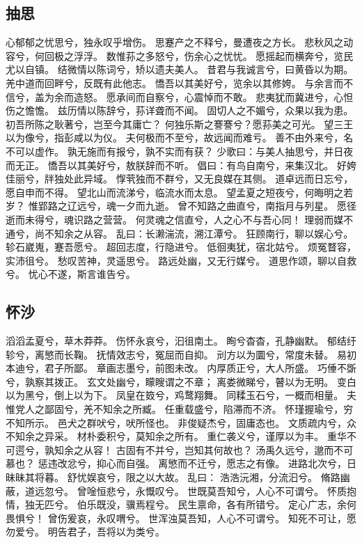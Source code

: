 \subsection{抽思}
心郁郁之忧思兮，独永叹乎增伤。
思蹇产之不释兮，曼遭夜之方长。
悲秋风之动容兮，何回极之浮浮。
数惟荪之多怒兮，伤余心之忧忧。
愿摇起而横奔兮，览民尤以自镇。
结微情以陈词兮，矫以遗夫美人。
昔君与我诚言兮，曰黄昏以为期。
羌中道而回畔兮，反既有此他志。
憍吾以其美好兮，览余以其修姱。
与余言而不信兮，盖为余而造怒。
愿承间而自察兮，心震悼而不敢。
悲夷犹而冀进兮，心怛伤之憺憺。
兹历情以陈辞兮，荪详聋而不闻。
固切人之不媚兮，众果以我为患。
初吾所陈之耿著兮，岂至今其庸亡？
何独乐斯之謇謇兮？愿荪美之可光。
望三王以为像兮，指彭咸以为仪。
夫何极而不至兮，故远闻而难亏。
善不由外来兮，名不可以虚作。
孰无施而有报兮，孰不实而有获？
少歌曰：与美人抽思兮，并日夜而无正。
憍吾以其美好兮，敖朕辞而不听。
倡曰：有鸟自南兮，来集汉北。
好姱佳丽兮，牉独处此异域。
惸茕独而不群兮，又无良媒在其侧。
道卓远而日忘兮，愿自申而不得。
望北山而流涕兮，临流水而太息。
望孟夏之短夜兮，何晦明之若岁？
惟郢路之辽远兮，魂一夕而九逝。
曾不知路之曲直兮，南指月与列星。
愿径逝而未得兮，魂识路之营营。
何灵魂之信直兮，人之心不与吾心同！
理弱而媒不通兮，尚不知余之从容。
乱曰：长濑湍流，溯江潭兮。
狂顾南行，聊以娱心兮。
轸石崴嵬，蹇吾愿兮。
超回志度，行隐进兮。
低徊夷犹，宿北姑兮。
烦冤瞀容，实沛徂兮。
愁叹苦神，灵遥思兮。
路远处幽，又无行媒兮。
道思作颂，聊以自救兮。
忧心不遂，斯言谁告兮。

\subsection{怀沙}
滔滔孟夏兮，草木莽莽。
伤怀永哀兮，汩徂南土。
眴兮杳杳，孔静幽默。
郁结纡轸兮，离慜而长鞠。
抚情效志兮，冤屈而自抑。
刓方以为圜兮，常度未替。
易初本迪兮，君子所鄙。
章画志墨兮，前图未改。
内厚质正兮，大人所盛。
巧倕不斲兮，孰察其拨正。
玄文处幽兮，矇瞍谓之不章；
离娄微睇兮，瞽以为无明。
变白以为黑兮，倒上以为下。
凤皇在笯兮，鸡鹜翔舞。
同糅玉石兮，一概而相量。
夫惟党人之鄙固兮，羌不知余之所臧。
任重载盛兮，陷滞而不济。
怀瑾握瑜兮，穷不知所示。
邑犬之群吠兮，吠所怪也。
非俊疑杰兮，固庸态也。
文质疏内兮，众不知余之异采。
材朴委积兮，莫知余之所有。
重仁袭义兮，谨厚以为丰。
重华不可遌兮，孰知余之从容！
古固有不并兮，岂知其何故也？
汤禹久远兮，邈而不可慕也？
惩违改忿兮，抑心而自强。
离慜而不迁兮，愿志之有像。
进路北次兮，日昧昧其将暮。
舒忧娱哀兮，限之以大故。
乱曰：
浩浩沅湘，分流汩兮。
脩路幽蔽，道远忽兮。
曾唫恒悲兮，永慨叹兮。
世既莫吾知兮，人心不可谓兮。
怀质抱情，独无匹兮。
伯乐既没，骥焉程兮。
民生禀命，各有所错兮。
定心广志，余何畏惧兮！
曾伤爰哀，永叹喟兮。
世浑浊莫吾知，人心不可谓兮。
知死不可让，愿勿爱兮。
明告君子，吾将以为类兮。

